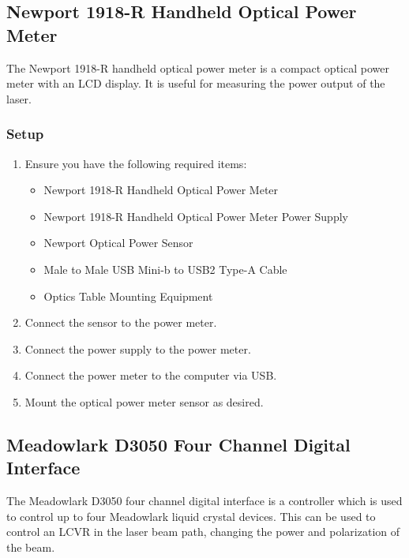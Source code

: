 \documentclass[11pt, letterpaper, titlepage]{article}
\begin{document}
\subsection{Newport 1918-R Handheld Optical Power Meter} %
The Newport 1918-R handheld optical power meter is a compact optical power meter with an LCD display.
It is useful for measuring the power output of the laser.
\subsubsection{Setup} %
\begin{enumerate}
    \item Ensure you have the following required items:
    \begin{itemize}
        \item Newport 1918-R Handheld Optical Power Meter
        \item Newport 1918-R Handheld Optical Power Meter Power Supply
        \item Newport Optical Power Sensor
        \item Male to Male USB Mini-b to USB2 Type-A Cable
        \item Optics Table Mounting Equipment
    \end{itemize}
    \item Connect the sensor to the power meter.
    \item Connect the power supply to the power meter.
    \item Connect the power meter to the computer via USB.
    \item Mount the optical power meter sensor as desired.
\end{enumerate}
\subsection{Meadowlark D3050 Four Channel Digital Interface} %
The Meadowlark D3050 four channel digital interface is a controller which is used to control up to four Meadowlark liquid crystal devices.
This can be used to control an LCVR in the laser beam path, changing the power and polarization of the beam.
\end{document}
